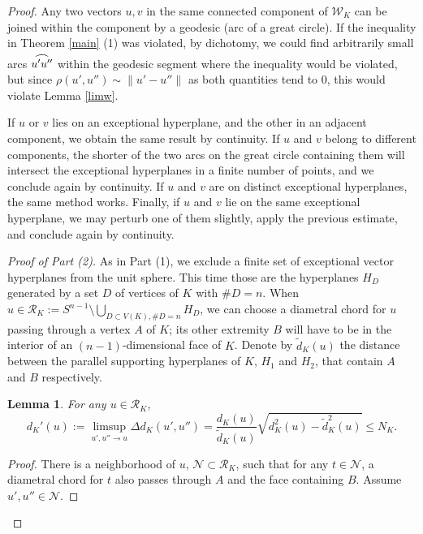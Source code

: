 \documentclass[a4paper,12pt]{amsart}
\newcommand{\arcs}[1]{\stackrel{\rotatebox{90}{\negthinspace\hspace{1pt}\big)}}{#1}}
\newtheorem{lemma}[thm]{Lemma}
\begin{document}
\begin{proof}
Any two vectors $u,v$ in the same connected component of
$\mathcal W_K$ can be joined
within the component by a geodesic (arc of a great circle). If
the inequality in Theorem \ref{main} (1) was violated, by dichotomy, we could find
arbitrarily small arcs $\arcs{u'u''}$
within the geodesic segment where the inequality
would be violated, but since $\rho(u',u'')  \sim \|u'-u''\|$ as both quantities tend
to $0$, this would violate Lemma \ref{limw}.

If $u$ or $v$ lies on an exceptional hyperplane, and the other in
an adjacent component, we obtain the same result by continuity. If
$u$ and $v$ belong to different components, the shorter of the two
arcs on the great circle containing them will intersect the
exceptional hyperplanes in a finite number of points, and we
conclude again by continuity.  If $u$ and $v$ are on distinct
exceptional hyperplanes, the same method works.  Finally, if $u$
and $v$ lie on the same exceptional hyperplane, we may perturb one
of them slightly, apply the previous estimate, and conclude again
by continuity.

\smallskip

{\it Proof of Part (2).} As in Part (1), we exclude a finite set
of exceptional vector hyperplanes from the unit sphere. This time
those are the hyperplanes $H_D$ generated by a set $D$ of vertices
of $K$ with $\# D=n$. When $u \in \mathcal R_K := S^{n-1}
\setminus \bigcup_{D\subset V(K), \# D=n} H_D $, we can choose a
diametral chord for $u$ passing through a vertex $A$ of $K$; its
other extremity $B$ will have to be in the interior of an
$(n-1)$-dimensional face of $K$. Denote by $\tilde d_K(u)$ the
distance between the parallel supporting hyperplanes of $K$, $H_1$
and $H_2$, that contain $A$ and $B$ respectively.

\begin{lemma}
\label{limd}
For any $u\in \mathcal R_K$,
\[
d_K'(u):= \limsup_{u',u''\to u} \Delta d_K(u',u'')
=
\frac{d_K(u)}{\tilde d_K(u)}\sqrt{d^2_K(u)-\tilde d^2_K(u)}\le N_K.
\]
\end{lemma}

\begin{proof}
There is a neighborhood of $u$, $\mathcal N\subset  \mathcal R_K$,
such that for any $t\in \mathcal N$, a diametral chord for $t$
also passes through $A$ and the face containing $B$. Assume $u',
u''\in \mathcal N$.


\end{proof}
\end{proof}
\end{document}
